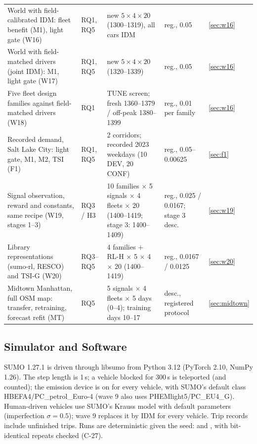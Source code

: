 \begin{table}[t]
\begin{tabular}{@{}p{5.3cm}p{1.5cm}p{6.0cm}p{2.5cm}l@{}}
World with field-calibrated IDM: fleet benefit (M1), light gate (W16) & RQ1, RQ5 & new $5\times4\times20$ (1300--1319), all cars IDM & reg., 0.05 & \ref{sec:w16}\\
World with field-matched drivers (joint IDM): M1, light gate (W17) & RQ1, RQ5 & new $5\times4\times20$ (1320--1339) & reg., 0.05 & \ref{sec:w16}\\
Five fleet design families against field-matched drivers (W18) & RQ1 & TUNE screen; fresh 1360--1379 / off-peak 1380--1399 & reg., 0.01 per family & \ref{sec:w16}\\
Recorded demand, Salt Lake City: light gate, M1, M2, TSI (F1) & RQ1, RQ5 & 2 corridors; recorded 2023 weekdays (10 DEV, 20 CONF) & reg., 0.05--0.00625 & \ref{sec:f1}\\
Signal observation, reward and constants, same recipe (W19, stages 1--3) & RQ3 / H3 & 10 families $\times$ 5 signals $\times$ 4 fleets $\times$ 20 (1400--1419; stage 3: 1400--1409) & reg., 0.025 / 0.0167; stage 3 desc. & \ref{sec:w19}\\
Library representations (sumo-rl, RESCO) and TSI-G (W20) & RQ3--RQ5 & 4 families + RL-H $\times$ 5 $\times$ 4 $\times$ 20 (1400--1419) & reg., 0.0167 / 0.0125 & \ref{sec:w20}\\
Midtown Manhattan, full OSM map: transfer, retraining, forecast refit (MT) & RQ5 & 5 signals $\times$ 4 fleets $\times$ 5 days (0--4); training days 10--17 & desc., registered protocol & \ref{sec:midtown}\\\bottomrule
\end{tabular}\end{table}

\subsection{Simulator and Software}
SUMO 1.27.1 \cite{lopez2018} is driven through libsumo from Python 3.12 (PyTorch 2.10, NumPy 1.26). The step length is 1\,s; a vehicle
blocked for 300\,s is teleported (and counted); the emission device is on for every vehicle, with SUMO's default class
HBEFA4/PC\_petrol\_Euro-4 \cite{krajzewicz2015} (wave 9 also uses PHEMlight5/PC\_EU4\_G). Human-driven vehicles use SUMO's Krauss model
\cite{krauss1998} with default parameters (imperfection $\sigma=0.5$); wave 9 replaces it by IDM \cite{treiber2000} for every vehicle.
Trip records include unfinished trips. Runs are deterministic given the seed:  and , with
bit-identical repeats checked (C-27).

